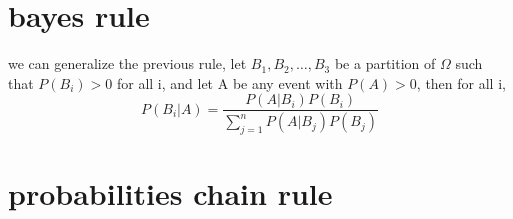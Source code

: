 \documentclass[4apaper,12pt]{book}
\begin{document}
  \section{bayes rule}
  \begin{description}
  \item we can generalize the previous rule, let $B_1,B_2,\dots,B_3$ be a partition of $\Omega$ such that $P(B_i)>0$ for all i, and let A be any event with $P(A)>0$, then for all i,
    \begin{equation}
      P(B_i|A) = \frac{P(A|B_i)P(B_i)}{\sum_{j=1}^{n}P(A|B_j)P(B_j)}
    \end{equation}
  \end{description}
  \section{probabilities chain rule}
\end{document}
